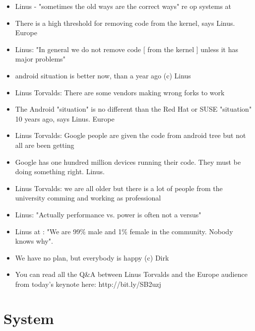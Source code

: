 \documentclass[10pt]{article}
\begin{document}
{\begin{itemize}
\item Linus - "sometimes the old ways are the correct ways" re op systems at 
\item There is a high threshold for removing code from the kernel, says Linus.  Europe
\item Linus: "In general we do not remove code [ from the kernel ] unless it has major problems" 
\item android situation is better now, than a year ago (c) Linus
\item Linus Torvalds: There are some vendors making wrong forks to work 
\item The Android "situation" is no different than the Red Hat or SUSE "situation" 10 years ago, says Linus.  Europe
\item Linus Torvalds: Google people are given the code from android tree but not all are been getting 
\item Google has one hundred million devices running their code. They must be doing something right. Linus. 
\item Linus Torvalds: we are all older but there is a lot of people from the university comming and working as professional 
\item Linus: "Actually performance vs. power is often not a versus" 
\item Linus at : "We are 99\% male and 1\% female in the community. Nobody knows why".
\item  We have no plan, but everybody is happy (c) Dirk
\item You can read all the Q\&A between Linus Torvalds and the  Europe audience from today's keynote here: http://bit.ly/SB2uzj
\end{itemize}

\section{System}
}
\end{document}

